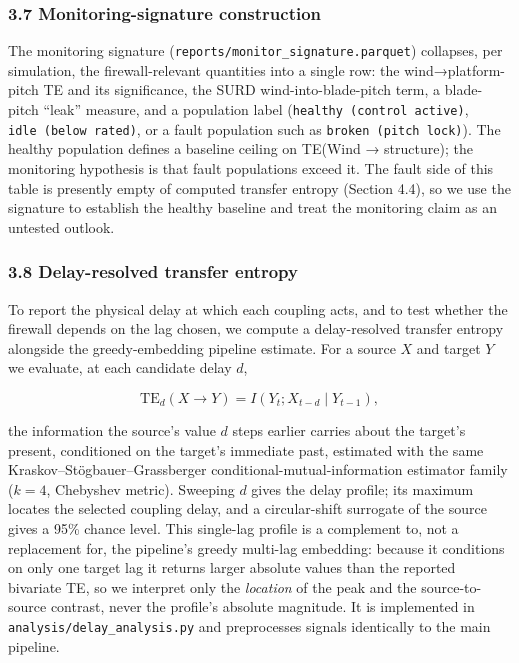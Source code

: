 \documentclass[
  english,
  11pt,
]{article}
\begin{document}
\subsubsection{3.7 Monitoring-signature
construction}\label{monitoring-signature-construction}

The monitoring signature (\texttt{reports/monitor\_signature.parquet})
collapses, per simulation, the firewall-relevant quantities into a
single row: the wind→platform-pitch TE and its significance, the SURD
wind-into-blade-pitch term, a blade-pitch ``leak'' measure, and a
population label (\texttt{healthy\ (control\ active)},
\texttt{idle\ (below\ rated)}, or a fault population such as
\texttt{broken\ (pitch\ lock)}). The healthy population defines a
baseline ceiling on TE(Wind → structure); the monitoring hypothesis is
that fault populations exceed it. The fault side of this table is
presently empty of computed transfer entropy (Section 4.4), so we use
the signature to establish the healthy baseline and treat the monitoring
claim as an untested outlook.

\subsubsection{3.8 Delay-resolved transfer
entropy}\label{delay-resolved-transfer-entropy}

To report the physical delay at which each coupling acts, and to test
whether the firewall depends on the lag chosen, we compute a
delay-resolved transfer entropy alongside the greedy-embedding pipeline
estimate. For a source \(X\) and target \(Y\) we evaluate, at each
candidate delay \(d\),

\[
\mathrm{TE}_d(X \to Y) = I\!\left(Y_t ; X_{t-d} \mid Y_{t-1}\right),
\]

the information the source's value \(d\) steps earlier carries about the
target's present, conditioned on the target's immediate past, estimated
with the same Kraskov--Stögbauer--Grassberger
conditional-mutual-information estimator family (\(k = 4\), Chebyshev
metric). Sweeping \(d\) gives the delay profile; its maximum locates the
selected coupling delay, and a circular-shift surrogate of the source
gives a 95\% chance level. This single-lag profile is a complement to,
not a replacement for, the pipeline's greedy multi-lag embedding:
because it conditions on only one target lag it returns larger absolute
values than the reported bivariate TE, so we interpret only the
\emph{location} of the peak and the source-to-source contrast, never the
profile's absolute magnitude. It is implemented in
\texttt{analysis/delay\_analysis.py} and preprocesses signals
identically to the main pipeline.
\end{document}
